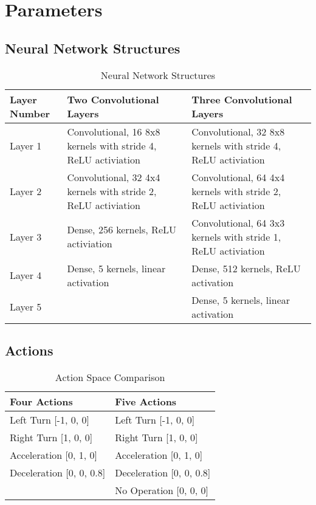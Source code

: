 \chapter{Parameters}\label{Parameters}

\section{Neural Network Structures}
\begin{table}[h!]
\begin{center}
\begin{tabular}{| l | l | l|}
\hline
Layer Number & Two Convolutional Layers & Three Convolutional Layers\\
\hline
Layer 1 & Convolutional, 16 8x8 kernels with stride 4, 
ReLU activiation & Convolutional, 32 8x8 kernels with stride 4, 
ReLU activiation\\
\hline
Layer 2 & Convolutional, 32 4x4 kernels with stride 2, 
ReLU activiation & Convolutional, 64 4x4 kernels with stride 2, 
ReLU activiation\\
\hline
Layer 3 & Dense, 256 kernels, ReLU activiation & Convolutional, 64 3x3 kernels with stride 1, ReLU activiation\\
\hline
Layer 4 & Dense, 5 kernels, linear activation & Dense, 512 kernels, ReLU activation\\
\hline
Layer 5 &  & Dense, 5 kernels, linear activation\\
\hline
\end{tabular}
\caption{Neural Network Structures}
\label{table: neuralstructures}
\end{center}
\end{table}

\section{Actions}
\begin{table}[h!]
\begin{center}
\begin{tabular}{| l | l|}
\hline
Four Actions & Five Actions\\
\hline
Left Turn [-1, 0, 0] & Left Turn [-1, 0, 0]\\
\hline
Right Turn [1, 0, 0] & Right Turn [1, 0, 0]\\
\hline
Acceleration [0, 1, 0] & Acceleration [0, 1, 0]\\
\hline
Deceleration [0, 0, 0.8] & Deceleration [0, 0, 0.8]\\
\hline
 & No Operation [0, 0, 0]\\
\hline
\end{tabular}
\caption{Action Space Comparison}
\label{table: ActionSpace}
\end{center}
\end{table}

